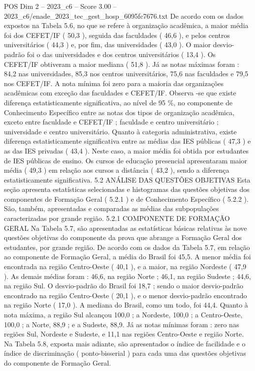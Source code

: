 \begin{textsample}{POS Dim 2 – 2023\_c6 – Score 3.00 – 2023\_c6/enade\_2023\_tec\_gest\_hosp\_6095fc7676.txt}
De acordo com os dados expostos na Tabela 5.6, no que se refere à organização acadêmica, a maior média foi dos CEFET/IF ( 50,3 ), seguida das faculdades ( 46,6 ), e pelos centros universitários ( 44,3 ) e, por fim, das universidades ( 43,0 ).
O maior desvio-padrão foi o das universidades e dos centros universitários ( 13,4 ).
Os CEFET/IF obtiveram a maior mediana ( 51,8 ).
Já as notas máximas foram : 84,2 nas universidades, 85,3 nos centros universitários, 75,6 nas faculdades e 79,5 nos CEFET/IF.
A nota mínima foi zero para a maioria das organizações acadêmicas com exceção das faculdades e CEFET/IF.
Observa -se que existe diferença estatisticamente significativa, ao nível de 95 \%, no componente de Conhecimento Específico entre as notas dos tipos de organização acadêmica, exceto entre faculdade e CEFET/IF ; faculdade e centro universitário ; universidade e centro universitário.
Quanto à categoria administrativa, existe diferença estatisticamente significativa entre as médias das IES públicas ( 47,3 ) e as das IES privadas ( 43,4 ).
Neste caso, a maior média foi obtida por estudantes de IES públicas de ensino.
Os cursos de educação presencial apresentaram maior média ( 49,3 ) em relação aos cursos a distância ( 43,2 ), sendo a diferença estatisticamente significativa. 5.2 ANÁLISE DAS QUESTÕES OBJETIVAS Esta seção apresenta estatísticas selecionadas e histogramas das questões objetivas dos componentes de Formação Geral ( 5.2.1 ) e de Conhecimento Específico ( 5.2.2 ).
São, também, apresentadas e comparadas as médias das subpopulações caracterizadas por grande região. 5.2.1 COMPONENTE DE FORMAÇÃO GERAL Na Tabela 5.7, são apresentadas as estatísticas básicas relativas às nove questões objetivas do componente da prova que abrange a Formação Geral dos estudantes, por grande região.
De acordo com os dados da Tabela 5.7, em relação ao componente de Formação Geral, a média do Brasil foi 45,5.
A menor média foi encontrada na região Centro-Oeste ( 40,1 ), e a maior, na região Nordeste ( 47,9 ).
As demais médias foram : 46,6, na região Norte ; 46,1, na região Sudeste ; 44,6, na região Sul.
O desvio-padrão do Brasil foi 18,7 ; sendo o maior desvio-padrão encontrado na região Centro-Oeste ( 20,1 ), e o menor desvio-padrão encontrado na região Norte ( 17,0 ).
A mediana do Brasil, como um todo, foi 44,4.
Quanto à nota máxima, a região Sul alcançou 100,0 ; a Nordeste, 100,0 ; a Centro-Oeste, 100,0 ; a Norte, 88,9 ; e a Sudeste, 88,9.
Já as notas mínimas foram : zero nas regiões Sul, Nordeste e Sudeste, e 11,1 nas regiões Centro-Oeste e região Norte.
Na Tabela 5.8, exposta mais adiante, são apresentados o índice de facilidade e o índice de discriminação ( ponto-bisserial ) para cada uma das questões objetivas do componente de Formação Geral.

\end{textsample}
